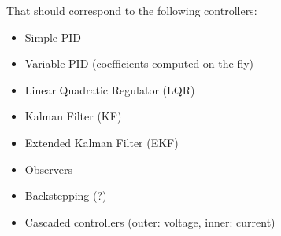 That should correspond to the following controllers:

\begin{itemize}
    \item Simple PID
    \item Variable PID (coefficients computed on the fly)
    \item Linear Quadratic Regulator (LQR)
    \item Kalman Filter (KF)
    \item Extended Kalman Filter (EKF)
    \item Observers
    \item Backstepping (?)
    \item Cascaded controllers (outer: voltage, inner: current)
\end{itemize}


% 
